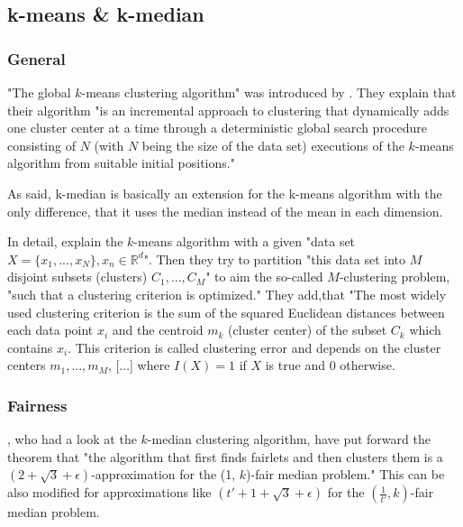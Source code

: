 \subsection{k-means \& k-median}
\label{k-means}
\label{k-median}

\subsubsection{General}

"The global $k$-means clustering algorithm" was introduced by \textcite[]{Likas2003}. They explain that their algorithm "is an incremental approach to clustering that dynamically adds one cluster center at a time through a deterministic global search procedure consisting of $N$ (with $N$ being the size of the data set) executions of the $k$-means algorithm from suitable initial positions." \autocite[1]{Likas2003}

As \textcite[]{Jain1988} said, k-median is basically an extension for the k-means algorithm with the only difference, that it uses the median instead of the mean in each dimension.

In detail, \textcite[2]{Likas2003} explain the $k$-means algorithm with a given "data set $X = \{x_{1},...,x_{N}\},x_{n} \in \mathbb{R}^d$". Then they try to partition "this data set into $M$ disjoint subsets (clusters) $C_{1},...,C_{M}$" to aim the so-called $M$-clustering problem, "such that a clustering criterion is optimized." They add,that "The most widely used clustering criterion is the sum of the squared Euclidean distances between each data point $x_{i}$ and the centroid $m_{k}$ (cluster center) of the subset $C_{k}$ which contains $x_{i}$. This criterion is called clustering error and depends on the cluster centers $m_{1},...,m_{M}$, [...] where $I(X) = 1$ if $X$ is true and $0$ otherwise.

\subsubsection{Fairness}

\textcite[]{Chierichetti2018}, who had a look at the $k$-median clustering algorithm, have put forward the theorem that "the algorithm that first finds fairlets and then clusters them is a $(2 + \sqrt{3} + \epsilon)$-approximation for the (1, $k$)-fair median problem." This can be also modified for approximations like $(t' + 1 + \sqrt{3} + \epsilon)$ for the $(\frac{1}{t'}, k)$-fair median problem. \autocite[9]{Chierichetti2018}

